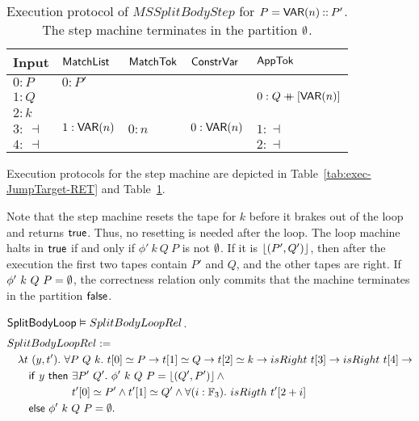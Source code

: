 \begin{table}
  \centering
  \begin{tabular}{l||l|l|l|l}
    Input       & $\mathsf{MatchList}$ & $\mathsf{MatchTok}$ & $\mathsf{ConstrVar}$ & $\mathsf{AppTok}$              \\ \hline
    $0:P$       & $0:P'$           &                 &                  &                            \\
    $1:Q$       &                  &                 &                  & $0: Q \mathbin{+\mkern-10mu+} [\mathsf{VAR}(n)]$  \\
    $2:k$       &                  &                 &                  &                            \\
    $3:~\dashv$ & $1: \mathsf{VAR}(n)$ & $0: n$          & $0: \mathsf{VAR}(n)$ & $1: \dashv$                \\
    $4:~\dashv$ &                  &                 &                  & $2: \dashv$                \\
  \end{tabular}
  \caption{Execution protocol of $MS{SplitBodyStep}$ for $P=\mathsf{VAR}(n) \mathbin{::} P'$.  The step machine terminates in the partition $\emptyset$.}
  \label{tab:exec-JumpTarget-VAR}
\end{table}

Execution protocols for the step machine are depicted in Table~\ref{tab:exec-JumpTarget-RET} and Table~\ref{tab:exec-JumpTarget-VAR}.

Note that the step machine resets the tape for $k$ before it brakes out of the loop and returns $\mathsf{true}$.  Thus, no resetting is needed after the loop.
The loop machine halts in $\mathsf{true}$ if and only if $\phi'~k~Q~P$ is not $\emptyset$.  If it is $\left\lfloor {(P',Q')} \right\rfloor$, then after the execution the first two
tapes contain $P'$ and $Q$, and the other tapes are right.  If $\phi'~k~Q~P = \emptyset$, the correctness relation only commits that the machine
terminates in the partition $\mathsf{false}$.
\begin{lemma}
  $\mathsf{SplitBodyLoop} \mathrel{\vDash} SplitBodyLoopRel$.
  \begin{alignat*}{1}
    & SplitBodyLoopRel := \\
    &\quad \lambda t~(y, t').~\forall P~Q~k.~t[0] \simeq P \rightarrow t[1] \simeq Q \rightarrow t[2] \simeq k \rightarrow isRight~t[3] \rightarrow isRight~t[4] \rightarrow \\
    &\quad\quad \MS{if}~y~\MS{then}~\exists P'~Q'.~ \phi'~k~Q~P = \Some{(Q', P')} \land \\
    &\quad\quad \phantom{\MS{if}~y~\MS{then}}~t'[0] \simeq P' \land t'[1] \simeq Q' \land \forall(i:\Fin_3).~isRigth~t'[2+i] \\
    &\quad\quad \MS{else}~\phi'~k~Q~P=\None.
\end{alignat*}
\end{lemma}

